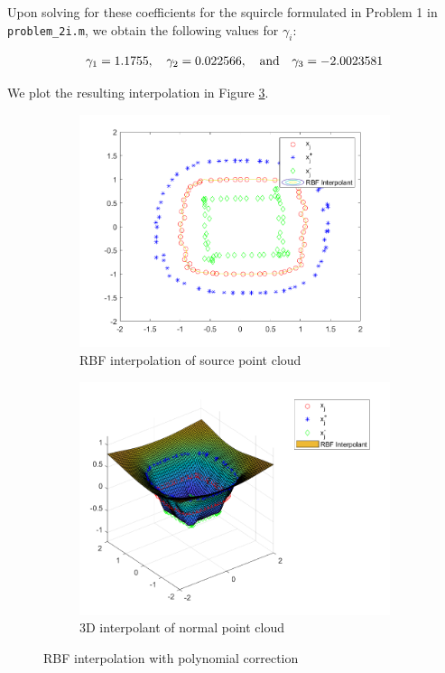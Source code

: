 \begin{solution}
    Upon solving for these coefficients for the squircle formulated in Problem 1 in \texttt{problem\_2i.m}, we obtain 
    the following values for $\gamma_i$:

    $$
        \gamma_1 = 1.1755, \quad \gamma_2 = 0.022566, \quad \text{and} \quad \gamma_3 = -2.0023581 \\
    $$
   
    We plot the resulting interpolation in Figure \ref{fig:problem_2i}.
    \begin{figure}[h]
        \centering
        \begin{subfigure}{0.49\textwidth}
            \includegraphics[width=\textwidth]{problem_2i_interpolant_2d.png}
            \caption{RBF interpolation of source point cloud}
            \label{fig:problem_2i_interpolant_2d}
        \end{subfigure}
        \begin{subfigure}{0.49\textwidth}
            \includegraphics[width=\textwidth]{problem_2i_interpolant_3d.png}
            \caption{3D interpolant of normal point cloud}
            \label{fig:problem_2i_interpolant_3d}
        \end{subfigure}
        \caption{RBF interpolation with polynomial correction}
        \label{fig:problem_2i}
    \end{figure}
\end{solution}